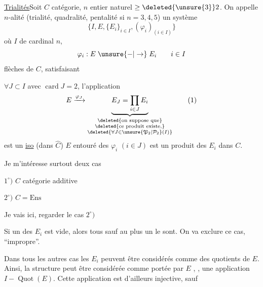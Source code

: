 \uline{Trialités}\qquad Soit $C$ catégorie, $n$ entier naturel $\geq\deleted{\unsure{3}}2$.
On appelle $n$-alité (trialité, quadralité, pentalité si $n=3,4,5$)
un système
\[
\{I,E,\{E_i\}_{i\in I},(\varphi_i)_{(i\in I)}\}
\]
où \quad $I$  de cardinal $n$,
\[
\varphi_i:E\mathrel{\unsure{-|\to}}E_i\qquad i\in I
\]
flèches de $C$, satisfaisant

$\forall J\subset I$ avec $\operatorname{card}J=2$, l'application
\[
E\xrightarrow{\varphi_J}\underbrace{E_J=\prod_{i\in J}E_i}_{
\substack{\deleted{\text{on suppose que}}\\\deleted{\text{ce produit existe,}}\\
\deleted{\forall J\in\unsure{\mathfrak P_2|\mathcal P_2}(I)}}}
\tag*{(1)}
\]
est un \uline{iso} (dans $\widehat C$) $E$ entouré des $\varphi_i$ $(i\in J)$ est un produit des
$E_i$ dans $C$.

\margin{[\, Les $n$-alités forment une catégorie $n$-al$(C)$, fibrée sur le groupoïde \deleted{\unsure{Ens}}\unsure{$\mathcal S_n$|$\mathrm{Ens}_n$}}

Je m'intéresse surtout  deux cas

$1^\circ)$ $C$ catégorie additive

$2^\circ)$ $C=\mathrm{Ens}$

 Je vais ici, regarder le cas $2^\circ)$

Si un des $E_i$ est vide, alors  tous sauf au plus
un le sont. On va exclure ce cas,  ``impropre''.

Dans tous les autres cas les $E_i$ peuvent
être considérés comme des quotients de $E$.
Ainsi, la structure peut être considérée comme
portée par $E$\deleted{\unsure{,}} , , une
application $I\mathrel{-}\operatorname{Quot}(E)$. Cette application
est d'ailleurs injective, sauf 

